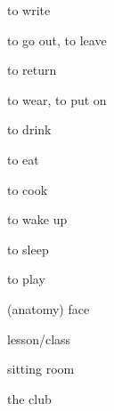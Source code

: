 \documentclass[avery5371,grid,frame]{flashcards}
\begin{document}
\begin{flashcard}{\LARGE to write}
\LARGE {}
\end{flashcard}
\begin{flashcard}{\LARGE to go out, to leave}
\LARGE {}
\end{flashcard}
\begin{flashcard}{\LARGE to return}
\LARGE {}
\end{flashcard}
\begin{flashcard}{\LARGE to wear, to put on}
\LARGE {}
\end{flashcard}
\begin{flashcard}{\LARGE to drink}
\LARGE {}
\end{flashcard}
\begin{flashcard}{\LARGE to eat}
\LARGE {}
\end{flashcard}
\begin{flashcard}{\LARGE to cook}
\LARGE {}
\end{flashcard}
\begin{flashcard}{\LARGE to wake up}
\LARGE {}
\end{flashcard}
\begin{flashcard}{\LARGE to sleep}
\LARGE {}
\end{flashcard}
\begin{flashcard}{\LARGE to play}
\LARGE {}
\end{flashcard}
\begin{flashcard}{\LARGE (anatomy) face}
\LARGE {}
\end{flashcard}
\begin{flashcard}{\LARGE lesson/class}
\LARGE {}
\end{flashcard}
\begin{flashcard}{\LARGE sitting room}
\LARGE {}
\end{flashcard}
\begin{flashcard}{\LARGE the club}
\LARGE {}
\end{flashcard}
\end{document}
